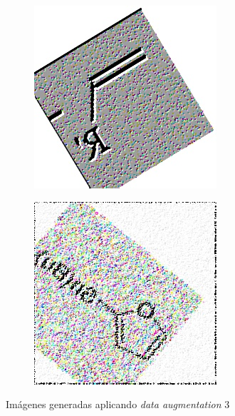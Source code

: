 \begin{figure}[H]
    \bigskip

    \begin{subfigure}{.35\textwidth}
        \centering
        \includegraphics[width=1\linewidth]{imagenes/aug3/225.jpg}
    \end{subfigure}%
    \begin{subfigure}{.35\textwidth}
        \centering
        \includegraphics[width=1\linewidth]{imagenes/aug3/271.jpg}
    \end{subfigure}

    \caption{Imágenes generadas aplicando \textit{data augmentation} 3}
\end{figure}

